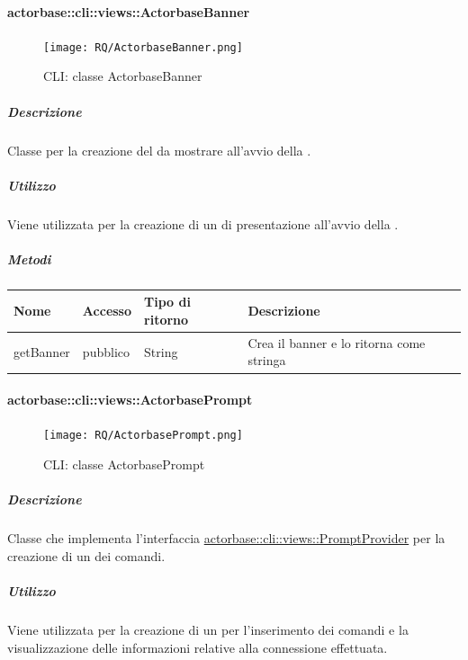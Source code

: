 \documentclass{scalatekids-article}
\begin{document}
\paragraph{actorbase::cli::views::ActorbaseBanner}
\label{sec:actorbase::cli::views::ActorbaseBanner}

\begin{figure}[H]
  \begin{center}
    \texttt{[image: RQ/ActorbaseBanner.png]}
    \caption{CLI: classe ActorbaseBanner}
  \end{center}
\end{figure}

\subparagraph{Descrizione}

Classe per la creazione del  da mostrare all'avvio della
.

\subparagraph{Utilizzo}

Viene utilizzata per la creazione di un  di presentazione
all'avvio della .

\subparagraph{Metodi}

\begin{tabular}{| p{3cm} | p{1.5cm} | p{3.5cm} | p{9cm} |}
  \hline
  Nome & Accesso & Tipo di ritorno & Descrizione\\
  \hline
  getBanner & pubblico & String & Crea il banner e lo ritorna come stringa\\
  \hline
\end{tabular}

\paragraph{actorbase::cli::views::ActorbasePrompt}
\label{sec:actorbase::cli::views::ActorbasePrompt}

\begin{figure}[H]
  \begin{center}
    \texttt{[image: RQ/ActorbasePrompt.png]}
    \caption{CLI: classe ActorbasePrompt}
  \end{center}
\end{figure}

\subparagraph{Descrizione}

Classe che implementa l'interfaccia \hyperref[sec:actorbase::cli::views::PromptProvider]{actorbase::cli::views::PromptProvider} per
la creazione di un  dei comandi.

\subparagraph{Utilizzo}

Viene utilizzata per la creazione di un  per l'inserimento dei
comandi e la visualizzazione delle informazioni relative alla connessione
effettuata.
\end{document}
